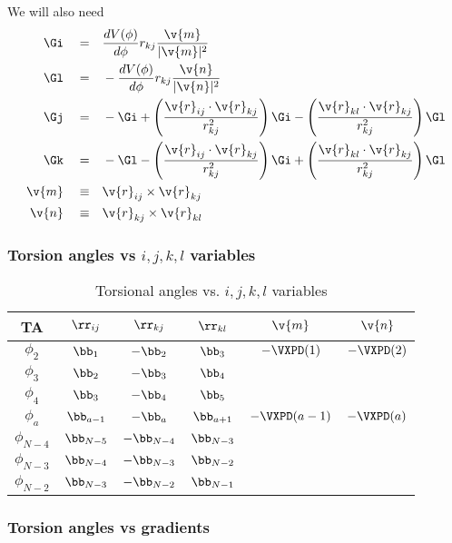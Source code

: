 We will also need \cite{Bekker95}
\begin{align}
  \Gi\quad=&\quad \frac{dV(\phi)}{d\phi}r_{kj}\frac{\v{m}}{|\v{m}|^2}\\
  \Gl\quad=&\quad-\frac{dV(\phi)}{d\phi}r_{kj}\frac{\v{n}}{|\v{n}|^2}\\
\Gj\quad=&\quad-\Gi +\left(\frac{\v{r}_{ij}\cdot{\v{r}_{kj}}}{r_{kj}^2}\right)\Gi
  -\left(\frac{\v{r}_{kl}\cdot{\v{r}_{kj}}}{r_{kj}^2}\right)\Gl\\
  \Gk\quad=&\quad-\Gl
  -\left(\frac{\v{r}_{ij}\cdot{\v{r}_{kj}}}{r_{kj}^2}\right)\Gi
  +\left(\frac{\v{r}_{kl}\cdot{\v{r}_{kj}}}{r_{kj}^2}\right)\Gl\\
\v{m}\quad\equiv&\quad\v{r}_{ij}\times\v{r}_{kj}\\
\v{n}\quad\equiv&\quad\v{r}_{kj}\times\v{r}_{kl}
\end{align}

\clearpage
\subsubsection{Torsion angles vs $i, j, k, l$ variables }

\begin{table}
  \centering
  \caption{Torsional angles vs. $i, j, k, l$ variables}
  \begin{tabular}{|*{6}{c|}}
\hline
TA 		& $\rr_{ij}$ 	& $\rr_{kj}$ 	& $\rr_{kl}$	& $\v{m}$	& $\v{n}$	  	\\
\hline
$\phi_2$	& $\bb_1$	& $-\bb_2$ 	& $\bb_3$	& $-\VXPD(1)$ 	& $-\VXPD(2)$ 		\\
$\phi_3$	& $\bb_2$	& $-\bb_3$	& $\bb_4$		\\
$\phi_4$	& $\bb_3$	& $-\bb_4$	& $\bb_5$		\\
$\phi_a$	& $\bb_{a-1}$	& $-\bb_a$	& $\bb_{a+1}$	& $-\VXPD(a-1)$ & $-\VXPD(a)$ 		\\
$\phi_{N-4}$	& $\bb_{N-5}$	& $-\bb_{N-4}$	& $\bb_{N-3}$		\\
$\phi_{N-3}$	& $\bb_{N-4}$	& $-\bb_{N-3}$	& $\bb_{N-2}$		\\
$\phi_{N-2}$	& $\bb_{N-3}$	& $-\bb_{N-2}$	& $\bb_{N-1}$		\\
\hline
  \end{tabular}
\end{table}

\clearpage
\subsubsection{Torsion angles vs gradients }

